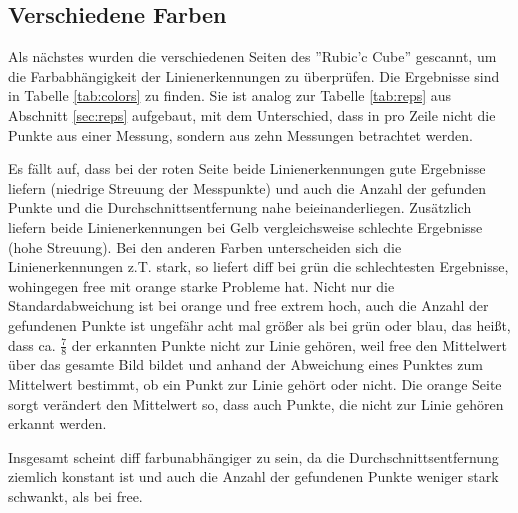 \documentclass[ngerman,a4paper,parskip=half]{scrartcl}
\begin{document}
\subsection{Verschiedene Farben}
\label{sec:cols}

Als nächstes wurden die verschiedenen Seiten des ''Rubic'c Cube'' gescannt, um die Farbabhängigkeit der Linienerkennungen zu überprüfen. Die Ergebnisse sind in Tabelle \ref{tab:colors} zu finden. Sie ist analog zur Tabelle \ref{tab:reps} aus Abschnitt \ref{sec:reps} aufgebaut, mit dem Unterschied, dass in pro Zeile nicht die Punkte aus einer Messung, sondern aus zehn Messungen betrachtet werden.

Es fällt auf, dass bei der roten Seite beide Linienerkennungen gute Ergebnisse liefern (niedrige Streuung der Messpunkte) und auch die Anzahl der gefunden Punkte und die Durchschnittsentfernung nahe beieinanderliegen. Zusätzlich liefern beide Linienerkennungen bei Gelb vergleichsweise schlechte Ergebnisse (hohe Streuung). Bei den anderen Farben unterscheiden sich die Linienerkennungen z.T. stark, so liefert diff bei grün die schlechtesten Ergebnisse, wohingegen free mit orange starke Probleme hat. Nicht nur die Standardabweichung ist bei orange und free extrem hoch, auch die Anzahl der gefundenen Punkte ist ungefähr acht mal größer als bei grün oder blau, das heißt, dass ca. $\frac{7}{8}$ der erkannten Punkte nicht zur Linie gehören, weil free den Mittelwert über das gesamte Bild bildet und anhand der Abweichung eines Punktes zum Mittelwert bestimmt, ob ein Punkt zur Linie gehört oder nicht. Die orange Seite sorgt verändert den Mittelwert so, dass auch Punkte, die nicht zur Linie gehören erkannt werden.

Insgesamt scheint diff farbunabhängiger zu sein, da die Durchschnittsentfernung ziemlich konstant ist und auch die Anzahl der gefundenen Punkte weniger stark schwankt, als bei free. 
\end{document}
